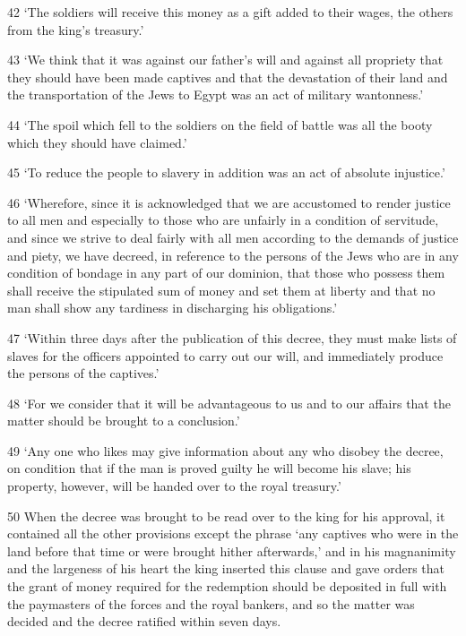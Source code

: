 \par 42 ‘The soldiers will receive this money as a gift added to their wages, the others from the king's treasury.’

\par 43 ‘We think that it was against our father's will and against all propriety that they should have been made captives and that the devastation of their land and the transportation of the Jews to Egypt was an act of military wantonness.’

\par 44 ‘The spoil which fell to the soldiers on the field of battle was all the booty which they should have claimed.’

\par 45 ‘To reduce the people to slavery in addition was an act of absolute injustice.’

\par 46 ‘Wherefore, since it is acknowledged that we are accustomed to render justice to all men and especially to those who are unfairly in a condition of servitude, and since we strive to deal fairly with all men according to the demands of justice and piety, we have decreed, in reference to the persons of the Jews who are in any condition of bondage in any part of our dominion, that those who possess them shall receive the stipulated sum of money and set them at liberty and that no man shall show any tardiness in discharging his obligations.’

\par 47 ‘Within three days after the publication of this decree, they must make lists of slaves for the officers appointed to carry out our will, and immediately produce the persons of the captives.’

\par 48 ‘For we consider that it will be advantageous to us and to our affairs that the matter should be brought to a conclusion.’

\par 49 ‘Any one who likes may give information about any who disobey the decree, on condition that if the man is proved guilty he will become his slave; his property, however, will be handed over to the royal treasury.’

\par 50 When the decree was brought to be read over to the king for his approval, it contained all the other provisions except the phrase ‘any captives who were in the land before that time or were brought hither afterwards,’ and in his magnanimity and the largeness of his heart the king inserted this clause and gave orders that the grant of money required for the redemption should be deposited in full with the paymasters of the forces and the royal bankers, and so the matter was decided and the decree ratified within seven days.

